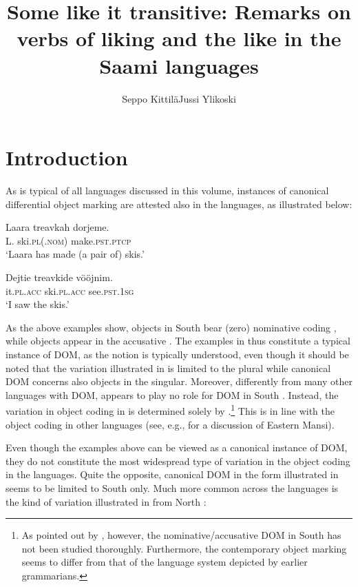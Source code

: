 \documentclass[output=paper]{LSP/langsci}
\author{Seppo Kittilä\affiliation{University of Helsinki}\lastand Jussi Ylikoski\affiliation{University of Oulu \& Sámi University of Applied Sciences}}
\title{Some like it transitive: Remarks on verbs of liking and the like in the Saami languages}
\begin{document}
\section{Introduction}
\label{16-sec:1}

As is typical of all languages discussed in this volume, instances of canonical differential object marking are attested also in the  languages, as illustrated below:

\ea{}\label{16-ki-ex:1}
\ea\label{16-ki-ex:1a}
\gll Laara treavkah dorjeme.\\
 L. ski.\textsc{pl}(.\textsc{nom}) make.\textsc{pst}.\textsc{ptcp}\\
\glt  ‘Laara has made (a pair of) skis.’ 

\ex\label{16-ki-ex:1b}
\gll Dejtie treavkide vööjnim.\\
 it.\textsc{pl}.\textsc{acc} ski.\textsc{pl}.\textsc{acc} see.\textsc{pst}.1\textsc{sg}\\
\glt  ‘I saw the skis.’ 
\z
\z

As the above examples show,  objects in South  bear (zero) nominative coding , while  objects appear in the accusative . The examples in  thus constitute a typical instance of DOM, as the notion is typically understood, even though it should be noted that the variation illustrated in  is limited to the plural while canonical DOM concerns also objects in the singular. Moreover, differently from many other languages with DOM,  appears to play no role for DOM in South . Instead, the variation in object coding in  is determined solely by .\footnote{As pointed out by \citet[208]{Siegl2012Strovtag}, however, the nominative/accusative DOM in South  has not been studied thoroughly. Furthermore, the contemporary object marking seems to differ from that of the language system depicted by earlier grammarians.} This is in line with the object coding in other  languages (see, e.g., \citealt{Virtanen2015Transitivity} for a discussion of Eastern Mansi).

 Even though the examples above can be viewed as a canonical instance of DOM, they do not constitute the most widespread type of variation in the object coding in the  languages. Quite the opposite, canonical DOM in the form illustrated in  seems to be limited to South  only. Much more common across the  languages is the kind of variation illustrated in  from North :
\end{document}

